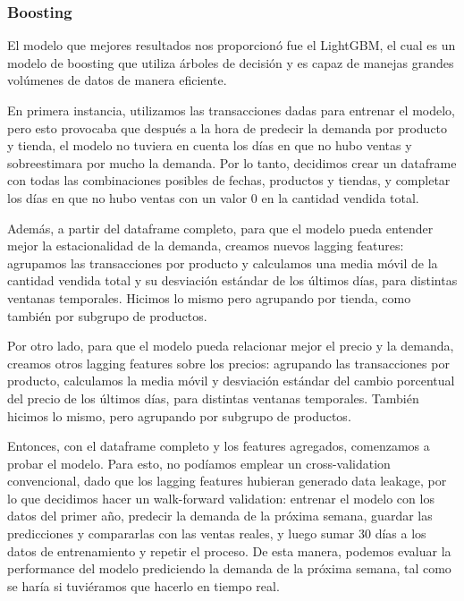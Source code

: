 \documentclass[12pt,a4paper]{article}
\begin{document}
        \vspace{0.2cm}

        \subsubsection{Boosting}

        El modelo que mejores resultados nos proporcionó fue el LightGBM, el cual es un modelo de boosting que utiliza árboles de decisión y 
        es capaz de manejas grandes volúmenes de datos de manera eficiente.

        \vspace{0.2cm}

    En primera instancia, utilizamos las transacciones dadas para entrenar el modelo, pero esto provocaba que después a la hora de 
    predecir la demanda por producto y tienda, el modelo no tuviera en cuenta los días en que no hubo ventas y sobreestimara por mucho 
    la demanda. Por lo tanto, decidimos crear un dataframe con todas las combinaciones posibles de fechas, productos y tiendas, y completar 
    los días en que no hubo ventas con un valor 0 en la cantidad vendida total.

    \vspace{0.2cm}

    Además, a partir del dataframe completo, para que el modelo pueda entender mejor la estacionalidad de la demanda, 
    creamos nuevos lagging features: agrupamos las transacciones por producto y calculamos 
    una media móvil de la cantidad vendida total y su desviación estándar de los últimos días, para distintas ventanas temporales. 
    Hicimos lo mismo pero agrupando por tienda, como también por subgrupo de productos.

    \vspace{0.2cm}

    Por otro lado, para que el modelo pueda relacionar mejor el precio y la demanda, creamos otros lagging features sobre los precios: 
    agrupando las transacciones por producto, calculamos la media móvil y desviación estándar del cambio porcentual del precio de los 
    últimos días, para distintas ventanas temporales. También hicimos lo mismo, pero agrupando por subgrupo de productos.

    \vspace{0.2cm}

    Entonces, con el dataframe completo y los features agregados, comenzamos a probar el modelo. Para esto, no podíamos emplear un cross-validation 
    convencional, dado que los lagging features hubieran generado data leakage, por lo que decidimos hacer un walk-forward validation: 
    entrenar el modelo con los datos del primer año, predecir la demanda de la próxima semana, guardar las predicciones y compararlas con 
    las ventas reales, y luego sumar 30 días a los datos de entrenamiento y repetir el proceso. De esta manera, podemos evaluar la performance del 
    modelo prediciendo la demanda de la próxima semana, tal como se haría si tuviéramos que hacerlo en tiempo real.
\end{document}

